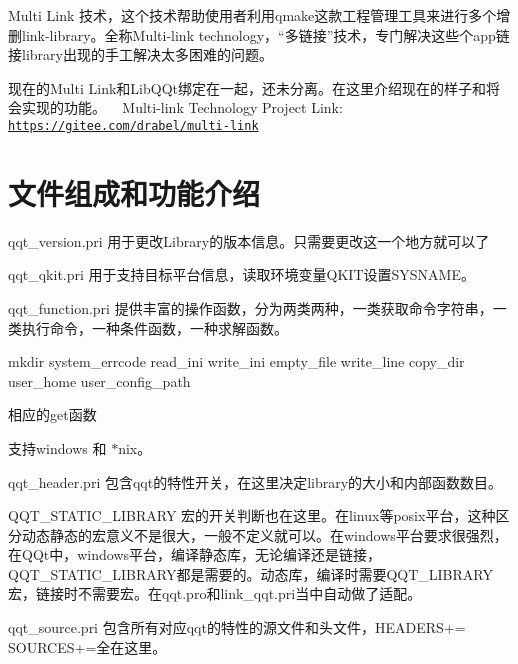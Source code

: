 Multi Link 技术，这个技术帮助使用者利用qmake这款工程管理工具来进行多个增删link-\/library。全称\+Multi-\/link technology，“多链接”技术，专门解决这些个app链接library出现的手工解决太多困难的问题。

现在的\+Multi Link和\+Lib\+Q\+Qt绑定在一起，还未分离。在这里介绍现在的样子和将会实现的功能。 ~\newline
 Multi-\/link Technology Project Link\+: \href{https://gitee.com/drabel/multi-link}{\tt https\+://gitee.\+com/drabel/multi-\/link}

\section*{文件组成和功能介绍}


\begin{DoxyEnumerate}
\item qqt\+\_\+version.\+pri 用于更改\+Library的版本信息。只需要更改这一个地方就可以了
\item qqt\+\_\+qkit.\+pri 用于支持目标平台信息，读取环境变量\+Q\+K\+I\+T设置\+S\+Y\+S\+N\+A\+M\+E。
\item qqt\+\_\+function.\+pri 提供丰富的操作函数，分为两类两种，一类获取命令字符串，一类执行命令，一种条件函数，一种求解函数。
\begin{DoxyItemize}
\item mkdir system\+\_\+errcode read\+\_\+ini write\+\_\+ini empty\+\_\+file write\+\_\+line copy\+\_\+dir user\+\_\+home user\+\_\+config\+\_\+path
\item 相应的get函数
\item 支持windows 和 $\ast$nix。
\end{DoxyItemize}
\item qqt\+\_\+header.\+pri 包含qqt的特性开关，在这里决定library的大小和内部函数数目。
\begin{DoxyItemize}
\item Q\+Q\+T\+\_\+\+S\+T\+A\+T\+I\+C\+\_\+\+L\+I\+B\+R\+A\+RY 宏的开关判断也在这里。在linux等posix平台，这种区分动态静态的宏意义不是很大，一般不定义就可以。在windows平台要求很强烈，在\+Q\+Qt中，windows平台，编译静态库，无论编译还是链接，\+Q\+Q\+T\+\_\+\+S\+T\+A\+T\+I\+C\+\_\+\+L\+I\+B\+R\+A\+R\+Y都是需要的。动态库，编译时需要\+Q\+Q\+T\+\_\+\+L\+I\+B\+R\+A\+R\+Y宏，链接时不需要宏。在qqt.\+pro和link\+\_\+qqt.\+pri当中自动做了适配。
\end{DoxyItemize}
\item qqt\+\_\+source.\+pri 包含所有对应qqt的特性的源文件和头文件，\+H\+E\+A\+D\+E\+R\+S+= S\+O\+U\+R\+C\+E\+S+=全在这里。

\end{DoxyEnumerate}
